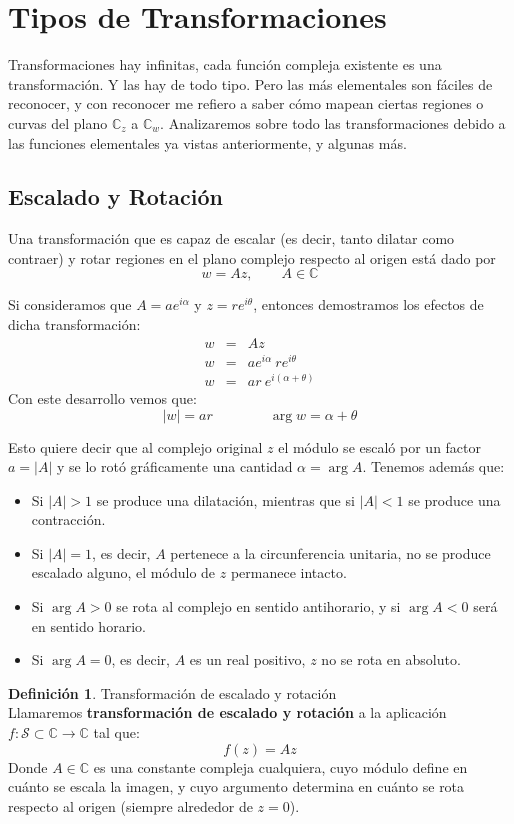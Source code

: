 \documentclass[12pt]{article}
\theoremstyle{definition}
\newtheorem{definition}{Definici\'on}[section]
\theoremstyle{theorem}
\theoremstyle{corolary}
\begin{document}
\section{Tipos de Transformaciones}
Transformaciones hay infinitas, cada funci\'on compleja existente es una transformaci\'on. Y las hay de todo tipo. Pero las m\'as elementales son f\'aciles de reconocer, y con reconocer me refiero a saber c\'omo mapean ciertas regiones o curvas del plano $\mathbb{C}_z$ a $\mathbb{C}_w$. Analizaremos sobre todo las transformaciones debido a las funciones elementales ya vistas anteriormente, y algunas m\'as.

\subsection{Escalado y Rotaci\'on}
Una transformaci\'on que es capaz de escalar (es decir, tanto dilatar como contraer) y rotar regiones en el plano complejo respecto al origen est\'a dado por $$w = Az, \qquad A \in \mathbb{C}$$

Si consideramos que $A=ae^{i\alpha}$ y $z = re^{i\theta}$, entonces demostramos los efectos de dicha transformaci\'on:
\begin{eqnarray*}
w &=& Az\\
w &=& ae^{i\alpha}\ re^{i\theta} \\
w &=& ar\ e^{i(\alpha + \theta)}
\end{eqnarray*}
Con este desarrollo vemos que: $$|w| = ar \qquad \qquad \arg w = \alpha + \theta$$

Esto quiere decir que al complejo original $z$ el m\'odulo se escal\'o por un factor $a = |A|$ y se lo rot\'o gr\'aficamente una cantidad $\alpha = \arg A$. Tenemos adem\'as que:
\begin{itemize}
	\item Si $|A|>1$ se produce una dilataci\'on, mientras que si $|A|<1$ se produce una contracci\'on.
	\item Si $|A|=1$, es decir, $A$ pertenece a la circunferencia unitaria, no se produce escalado alguno, el m\'odulo de $z$ permanece intacto.
	\item Si $\arg A > 0$ se rota al complejo en sentido antihorario, y si $\arg A < 0$ ser\'a en sentido horario.
	\item Si $\arg A = 0$, es decir, $A$ es un real positivo, $z$ no se rota en absoluto.
\end{itemize}


\colorbox{green!40!white!80}{\parbox{\linewidth}{
 \theoremstyle{definition}
 \begin{definition}{Transformaci\'on de escalado y rotaci\'on}\\
  	Llamaremos \textbf{transformaci\'on de escalado y rotaci\'on} a la aplicaci\'on $f: \mathcal{S} \subset \mathbb{C} \rightarrow \mathbb{C}$ tal que: $$f(z) = Az$$ Donde $A \in \mathbb{C}$ es una constante compleja cualquiera, cuyo m\'odulo define en cu\'anto se escala la imagen, y cuyo argumento determina en cu\'anto se rota respecto al origen (siempre alrededor de $z=0$).
 \end{definition}}}
\linebreak
\linebreak
\end{document}
